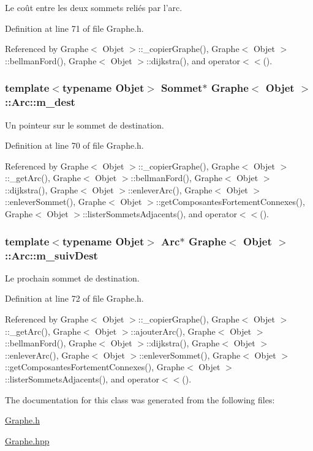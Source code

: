 Le coût entre les deux sommets reliés par l'arc. 



Definition at line 71 of file Graphe.h.



Referenced by Graphe$<$ Objet $>$::\_\-copierGraphe(), Graphe$<$ Objet $>$::bellmanFord(), Graphe$<$ Objet $>$::dijkstra(), and operator$<$$<$().

\hypertarget{class_graphe_1_1_arc_a9d1f11eb639df5e712b859b95d8c6d15}{
\subsubsection[{m\_\-dest}]{\setlength{\rightskip}{0pt plus 5cm}template$<$typename Objet$>$ {\bf Sommet}$\ast$ {\bf Graphe}$<$ Objet $>$::{\bf Arc::m\_\-dest}}}
\label{class_graphe_1_1_arc_a9d1f11eb639df5e712b859b95d8c6d15}


Un pointeur sur le sommet de destination. 



Definition at line 70 of file Graphe.h.



Referenced by Graphe$<$ Objet $>$::\_\-copierGraphe(), Graphe$<$ Objet $>$::\_\-getArc(), Graphe$<$ Objet $>$::bellmanFord(), Graphe$<$ Objet $>$::dijkstra(), Graphe$<$ Objet $>$::enleverArc(), Graphe$<$ Objet $>$::enleverSommet(), Graphe$<$ Objet $>$::getComposantesFortementConnexes(), Graphe$<$ Objet $>$::listerSommetsAdjacents(), and operator$<$$<$().

\hypertarget{class_graphe_1_1_arc_a48a25d83dfc9f2230050c40939a1cbe9}{
\subsubsection[{m\_\-suivDest}]{\setlength{\rightskip}{0pt plus 5cm}template$<$typename Objet$>$ {\bf Arc}$\ast$ {\bf Graphe}$<$ Objet $>$::{\bf Arc::m\_\-suivDest}}}
\label{class_graphe_1_1_arc_a48a25d83dfc9f2230050c40939a1cbe9}


Le prochain sommet de destination. 



Definition at line 72 of file Graphe.h.



Referenced by Graphe$<$ Objet $>$::\_\-copierGraphe(), Graphe$<$ Objet $>$::\_\-getArc(), Graphe$<$ Objet $>$::ajouterArc(), Graphe$<$ Objet $>$::bellmanFord(), Graphe$<$ Objet $>$::dijkstra(), Graphe$<$ Objet $>$::enleverArc(), Graphe$<$ Objet $>$::enleverSommet(), Graphe$<$ Objet $>$::getComposantesFortementConnexes(), Graphe$<$ Objet $>$::listerSommetsAdjacents(), and operator$<$$<$().



The documentation for this class was generated from the following files:\begin{DoxyCompactItemize}
\item 
\hyperlink{_graphe_8h}{Graphe.h}\item 
\hyperlink{_graphe_8hpp}{Graphe.hpp}\end{DoxyCompactItemize}
